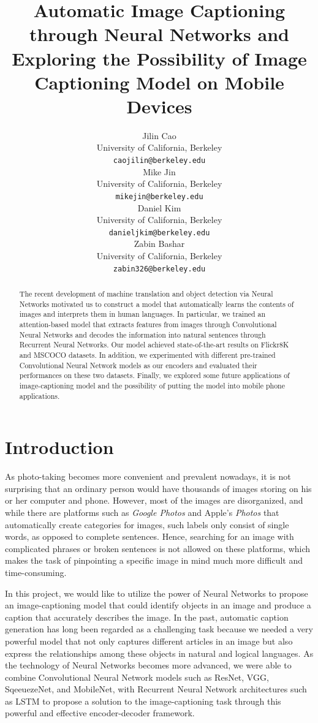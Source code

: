 \documentclass{article}
\title{Automatic Image Captioning through Neural Networks and Exploring the Possibility of Image Captioning Model on Mobile Devices}
\author{%
  Jilin Cao \\
  University of California, Berkeley\\
  \texttt{caojilin@berkeley.edu} \\
  \And
  Mike Jin \\
  University of California, Berkeley\\
  \texttt{mikejin@berkeley.edu} \\
  \And
  Daniel Kim \\
  University of California, Berkeley\\
  \texttt{danieljkim@berkeley.edu} \\
  \And
  Zabin Bashar \\
  University of California, Berkeley\\
  \texttt{zabin326@berkeley.edu} \\
}
\begin{document}

\maketitle

\begin{abstract}
The recent development of machine translation and object detection via Neural Networks motivated us to construct a model that automatically learns the contents of images and interprets them in human languages. In particular, we trained an attention-based model that extracts features from images through Convolutional Neural Networks and decodes the information into natural sentences through Recurrent Neural Networks. Our model achieved state-of-the-art results on Flickr8K and MSCOCO datasets. In addition, we experimented with different pre-trained Convolutional Neural Network models as our encoders and evaluated their performances on these two datasets. Finally, we explored some future applications of image-captioning model and the possibility of putting the model into mobile phone applications.
\end{abstract}

\section{Introduction}

As photo-taking becomes more convenient and prevalent nowadays, it is not surprising that an ordinary person would have thousands of images storing on his or her computer and phone. However, most of the images are disorganized, and while there are platforms such as \textit{Google Photos} and Apple’s \textit{Photos} that automatically create categories for images, such labels only consist of single words, as opposed to complete sentences. Hence, searching for an image with complicated phrases or broken sentences is not allowed on these platforms, which makes the task of pinpointing a specific image in mind much more difficult and time-consuming.

In this project, we would like to utilize the power of Neural Networks to propose an image-captioning model that could identify objects in an image and produce a caption that accurately describes the image. In the past, automatic caption generation has long been regarded as a challenging task because we needed a very powerful model that not only captures different articles in an image but also express the relationships among these objects in natural and logical languages. As the technology of Neural Networks becomes more advanced, we were able to combine Convolutional Neural Network models such as ResNet, VGG, SqeeuezeNet, and MobileNet, with Recurrent Neural Network architectures such as LSTM to propose a solution to the image-captioning task through this powerful and effective encoder-decoder framework.
\end{document}
